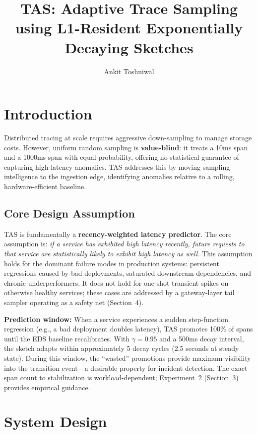 \documentclass[sigconf,nonacm]{acmart}
\title{TAS: Adaptive Trace Sampling using L1-Resident Exponentially Decaying Sketches}
\author{Ankit Toshniwal}
\affiliation{%
  \institution{Independent Researcher}
  \city{Jersey City} \state{New Jersey} \country{USA}
}
\begin{document}
\maketitle

\section{Introduction}

Distributed tracing at scale requires aggressive down-sampling to manage storage costs.
However, uniform random sampling is \textbf{value-blind}: it treats a 10ms span and a
1000ms span with equal probability, offering no statistical guarantee of capturing
high-latency anomalies. TAS addresses this by moving sampling intelligence to the
ingestion edge, identifying anomalies relative to a rolling, hardware-efficient baseline.

\subsection{Core Design Assumption}

TAS is fundamentally a \textbf{recency-weighted latency predictor}. The core assumption
is: \textit{if a service has exhibited high latency recently, future requests to that
service are statistically likely to exhibit high latency as well.} This assumption holds
for the dominant failure modes in production systems: persistent regressions caused by
bad deployments, saturated downstream dependencies, and chronic underperformers. It does
not hold for one-shot transient spikes on otherwise healthy services; these cases are
addressed by a gateway-layer tail sampler operating as a safety net (Section~4).

\textbf{Prediction window:} When a service experiences a sudden step-function regression
(e.g., a bad deployment doubles latency), TAS promotes 100\% of spans until the EDS
baseline recalibrates. With $\gamma=0.95$ and a 500ms decay interval, the sketch adapts
within approximately 5 decay cycles (2.5 seconds at steady state). During this window,
the ``wasted'' promotions provide maximum visibility into the transition event---a
desirable property for incident detection. The exact span count to stabilization is
workload-dependent; Experiment~2 (Section~3) provides empirical guidance.

\section{System Design}
\end{document}
